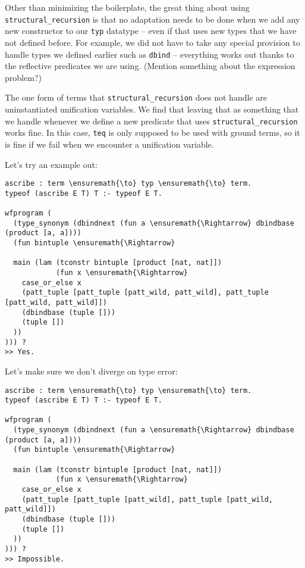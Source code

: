 Other than minimizing the boilerplate, the great thing about using
\texttt{structural\_recursion} is that no adaptation needs to be done
when we add any new constructor to our \texttt{typ} datatype -- even if
that uses new types that we have not defined before. For example, we did
not have to take any special provision to handle types we defined
earlier such as \texttt{dbind} -- everything works out thanks to the
reflective predicates we are using. (Mention something about the
expression problem?)

The one form of terms that \texttt{structural\_recursion} does not
handle are uninstantiated unification variables. We find that leaving
that as something that we handle whenever we define a new predicate that
uses \texttt{structural\_recursion} works fine. In this case,
\texttt{teq} is only supposed to be used with ground terms, so it is
fine if we fail when we encounter a unification variable.

Let's try an example out:

\begin{verbatim}
ascribe : term \ensuremath{\to} typ \ensuremath{\to} term.
typeof (ascribe E T) T :- typeof E T.

wfprogram (
  (type_synonym (dbindnext (fun a \ensuremath{\Rightarrow} dbindbase (product [a, a])))
  (fun bintuple \ensuremath{\Rightarrow} 
  
  main (lam (tconstr bintuple [product [nat, nat]])
            (fun x \ensuremath{\Rightarrow} 
    case_or_else x
    (patt_tuple [patt_tuple [patt_wild, patt_wild], patt_tuple [patt_wild, patt_wild]])
    (dbindbase (tuple []))
    (tuple [])
  ))
))) ?
>> Yes.
\end{verbatim}

Let's make sure we don't diverge on type error:

\begin{verbatim}
ascribe : term \ensuremath{\to} typ \ensuremath{\to} term.
typeof (ascribe E T) T :- typeof E T.

wfprogram (
  (type_synonym (dbindnext (fun a \ensuremath{\Rightarrow} dbindbase (product [a, a])))
  (fun bintuple \ensuremath{\Rightarrow} 
  
  main (lam (tconstr bintuple [product [nat, nat]])
            (fun x \ensuremath{\Rightarrow} 
    case_or_else x
    (patt_tuple [patt_tuple [patt_wild], patt_tuple [patt_wild, patt_wild]])
    (dbindbase (tuple []))
    (tuple [])
  ))
))) ?
>> Impossible.
\end{verbatim}
